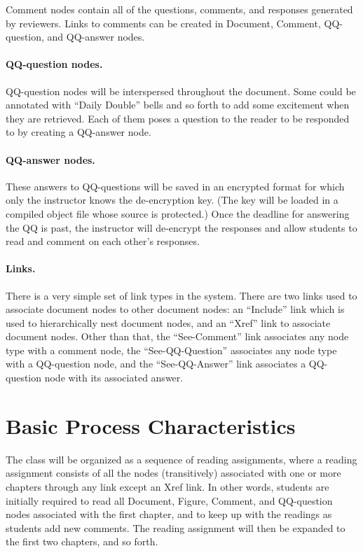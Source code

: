 Comment nodes contain all of the questions, comments, and responses
generated by reviewers.  Links to comments can be created in Document,
Comment, QQ-question, and QQ-answer nodes.

\paragraph {QQ-question nodes.}

QQ-question nodes will be interspersed throughout the document.  Some could
be annotated with ``Daily Double'' bells and so forth to add some
excitement when they are retrieved. Each of them poses a question to the
reader to be responded to by creating a QQ-answer node.  

\paragraph {QQ-answer nodes.}

These answers to QQ-questions will be saved in an encrypted format for
which only the instructor knows the de-encryption key.  (The key will be
loaded in a compiled object file whose source is protected.)  Once the
deadline for answering the QQ is past, the instructor will de-encrypt the
responses and allow students to read and comment on each other's responses.

\paragraph {Links.}

There is a very simple set of link types in the system. There are two links
used to associate document nodes to other document nodes: an ``Include''
link which is used to hierarchically nest document nodes, and an ``Xref''
link to associate document nodes.  Other than that, the ``See-Comment''
link associates any node type with a comment node, the ``See-QQ-Question''
associates any node type with a QQ-question node, and the ``See-QQ-Answer''
link associates a QQ-question node with its associated answer.

\section{Basic Process Characteristics}

The class will be organized as a sequence of reading assignments, where a
reading assignment consists of all the nodes (transitively) associated with
one or more chapters through any link except an Xref link.  In other words,
students are initially required to read all Document, Figure, Comment, and
QQ-question nodes associated with the first chapter, and to keep up with
the readings as students add new comments.  The reading assignment will
then be expanded to the first two chapters, and so forth.  

